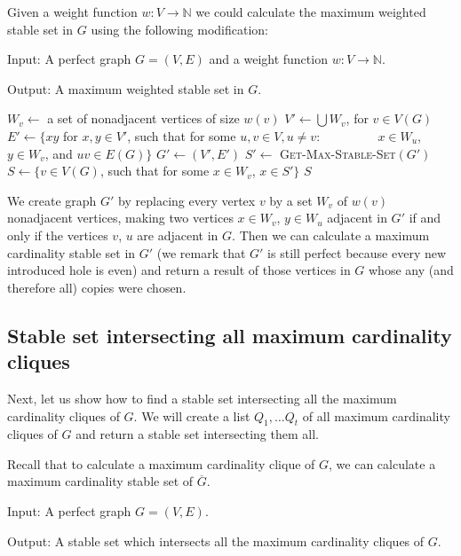Given a weight function $w : V \rightarrow \mathbb{N}$ we could calculate the maximum weighted stable set in $G$ using the following modification: 

\begin{alg}
  \label{alg:maxWeightedStableSet}
  Input: A perfect graph $G = (V, E)$ and a weight function $w : V \rightarrow \mathbb{N}$.

  \noindent Output: A maximum weighted stable set in $G$.
\end{alg}

\begin{algorithmic}[1]
    \ls $W_v \gets$ a set of nonadjacent vertices of size $w(v)$
  \mEndFor
  \ls $V' \gets \bigcup W_v$, for $v \in V(G)$ 
  \ls $E' \gets \{xy$ for $x, y \in V'$, such that for some $u, v \in V, u \neq v$:
  \lsx~~~~~~~~ $x \in W_u$, $y \in W_v$, and $uv \in E(G)\}$
  \ls $G' \gets (V', E')$
  \ls $S' \gets$ \textsc{Get-Max-Stable-Set$(G')$}
  \ls $S \gets \{v \in V(G)$, such that for some $x\in W_v$, $x \in S'\}$
  \ls \RETURN $S$
  \mEndProcedure
\end{algorithmic}

We create graph $G'$ by replacing every vertex $v$ by a set $W_v$ of $w(v)$ nonadjacent vertices, making two vertices $x \in W_v$, $y \in W_u$ adjacent in $G'$ if and only if the vertices $v$, $u$ are adjacent in $G$. Then we can calculate a maximum cardinality stable set in $G'$ (we remark that $G'$ is still perfect because every new introduced hole is even) and return a result of those vertices in $G$ whose any (and therefore all) copies were chosen.

\subsection{Stable set intersecting all maximum cardinality cliques}
Next, let us show how to find a stable set intersecting all the maximum cardinality cliques of $G$. We will create a list $Q_1, \ldots Q_t$ of all maximum cardinality cliques of $G$ and return a stable set intersecting them all.

Recall that to calculate a maximum cardinality clique of $G$, we can calculate a maximum cardinality stable set of $\overline{G}$.
\begin{alg}
  \label{alg:ssIntersectingCliques}
  Input: A perfect graph $G = (V, E)$.

  \noindent Output: A stable set which intersects all the maximum cardinality cliques of $G$.
\end{alg}

